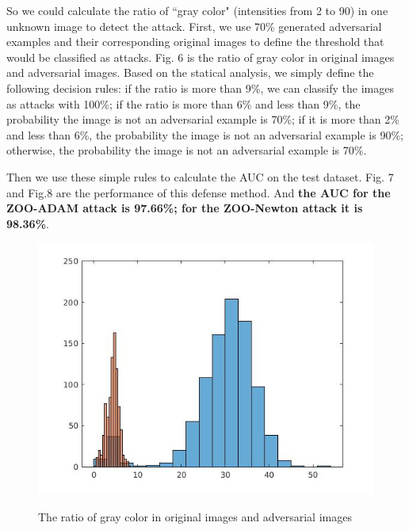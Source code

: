 \documentclass[a4paper]{article}
\begin{document}
So we could calculate the ratio of ``gray color" (intensities from 2 to 90) in one unknown image to detect the attack.
First, we use 70\% generated adversarial examples and their corresponding original images to define the threshold that would be classified as attacks. Fig. 6 is the ratio of gray color in original images and adversarial images. Based on the statical analysis, we simply define the following decision rules: if the ratio is more than 9\%, we can classify the images as attacks with 100\%; if the ratio is more than 6\% and less than 9\%, the probability the image is not an adversarial example is 70\%; if it is more than 2\% and less than 6\%, the probability the image is not an adversarial example is 90\%; otherwise, the probability the image is not an adversarial example is 70\%.

Then we use these simple rules to calculate the AUC on the test dataset. Fig. 7 and Fig.8 are the performance of this defense method.
And \textbf{the AUC for the ZOO-ADAM attack is 97.66\%; for the ZOO-Newton attack it is 98.36\%}.
\begin{figure}
\centering
\includegraphics[scale=0.5]{freq3.jpg}
\label{freq3}
\caption{The ratio of gray color in original images and adversarial images}
\end{figure}
\end{document}
